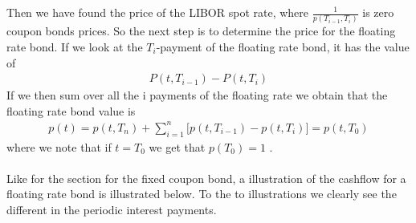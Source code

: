 Then we have found the price of the LIBOR spot rate, where $\frac{1}{p(T_{i-1},T_i)}$ is zero coupon bonds prices. 
So the next step is to determine the price for the floating rate bond. If we look at the $T_i$-payment of the floating rate bond, 
it has the value of
\begin{align*}
    P(t,T_{i-1})-P(t,T_i)
\end{align*}
If we then sum over all the i payments of the floating rate we obtain that the floating rate bond value is
\begin{align*}
    p(t)= p(t,T_n) + \sum_{i=1}^{n}\Big[p(t,T_{i-1})-p(t,T_i)\Big] = p(t,T_0) 
\end{align*}
where we note that if $t=T_0$ we get that $p(T_0)=1$ \cite{Bjork}. \\\\
Like for the section for the fixed coupon bond, a illustration of the cashflow for a floating rate bond is illustrated below.
To the to illustrations we clearly see the different in the periodic interest payments. 
\begin{center}
\end{center}
